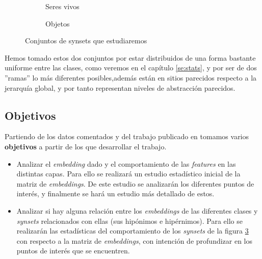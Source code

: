 \documentclass[12,twoside]{TFG-GM}
\theoremstyle{definition}
\theoremstyle{remark}
\begin{document}
\begin{figure}[H]
\centering
\begin{subfigure}{.5\textwidth}
  \centering
  \caption{Seres vivos}
  \label{fig:sub1}
\end{subfigure}%
\begin{subfigure}{.5\textwidth}
  \centering
  \caption{Objetos}
  \label{fig:sub2}
\end{subfigure}
\caption{Conjuntos de synsets que estudiaremos \label{fig:synsets}}

\end{figure}

Hemos tomado estos dos conjuntos por estar distribuidos de una forma bastante uniforme entre las clases, como veremos en el capítulo \ref{se:stats}, y por ser de dos ''ramas'' lo más diferentes posibles,además están en sitios parecidos respecto a la jerarquía global, y por tanto representan niveles de abstracción parecidos. 

 
\subsection{Objetivos}
Partiendo de los datos comentados y del trabajo publicado en \cite{fne} tomamos varios \textbf{objetivos} a partir de los que desarrollar el trabajo.

\begin{itemize}
\item Analizar el \textit{embedding} dado y el comportamiento de las \textit{features} en las distintas capas. Para ello se realizará un estudio estadístico inicial de la matriz de \textit{embeddings}. De este estudio se analizarán los diferentes puntos de interés, y finalmente se hará un estudio más detallado de estos.  
\item Analizar si hay alguna relación entre los \textit{embeddings} de las diferentes clases y \textit{synsets} relacionados con ellas (sus hipónimos e hipérnimos). Para ello se realizarán las estadísticas del comportamiento de los \textit{synsets} de la figura \ref{fig:synsets} con respecto a la matriz de \textit{embeddings}, con intención de profundizar en los puntos de interés que se encuentren. 
\end{itemize}
\end{document}
